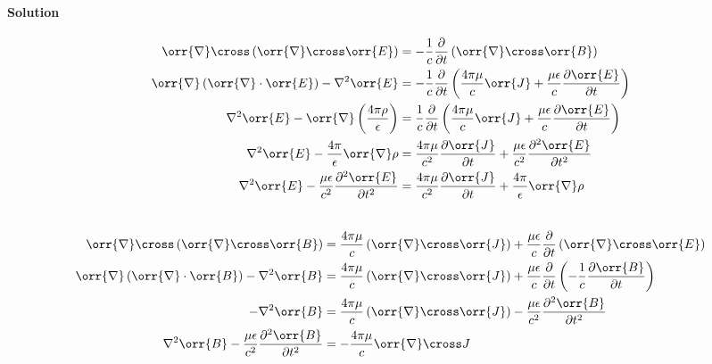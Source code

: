 \documentclass{article}
\begin{document}
{\begin{enumerate}
\begin{enumerate}
				\paragraph{Solution} \unboldmath  
				\begin{equation*}
					\begin{split}
						\orr{\nabla} \cross \left( \orr{\nabla} \cross \orr{E} \right) &= -\frac{1}{c} \frac{\partial}{\partial t} \left( \orr{\nabla} \cross \orr{B} \right) \\
						\orr{\nabla} \left( \orr{\nabla} \cdot \orr{E} \right) - \nabla^2 \orr{E} &= -\frac{1}{c} \frac{\partial}{\partial t} \left( \frac{4\pi \mu}{c} \orr{J} + \frac{\mu \epsilon}{c} \frac{\partial \orr{E}}{\partial t} \right) \\
						\nabla^2 \orr{E} - \orr{\nabla} \left( \frac{4\pi \rho}{\epsilon} \right) &= \frac{1}{c} \frac{\partial}{\partial t} \left( \frac{4\pi \mu}{c} \orr{J} + \frac{\mu \epsilon}{c} \frac{\partial \orr{E}}{\partial t} \right) \\
						\nabla^2 \orr{E} - \frac{4\pi}{\epsilon} \orr{\nabla} \rho  &= \frac{4\pi \mu}{c^2} \frac{\partial \orr{J}}{\partial t} + \frac{\mu \epsilon}{c^2} \frac{\partial^2 \orr{E}}{\partial t^2} \\
						\nabla^2 \orr{E} - \frac{\mu \epsilon}{c^2} \frac{\partial^2 \orr{E}}{\partial t^2} &= \frac{4\pi \mu}{c^2} \frac{\partial \orr{J}}{\partial t} + \frac{4\pi}{\epsilon} \orr{\nabla} \rho
					\end{split}
				\end{equation*} \\
				\begin{equation*}
					\begin{split}
						\orr{\nabla} \cross \left( \orr{\nabla} \cross \orr{B} \right) &= \frac{4\pi \mu}{c} \left( \orr{\nabla} \cross \orr{J} \right) + \frac{\mu \epsilon}{c} \frac{\partial}{\partial t} \left( \orr{\nabla} \cross \orr{E} \right) \\
						\orr{\nabla} \left( \orr{\nabla} \cdot \orr{B} \right) -\nabla^2 \orr{B} &= \frac{4\pi \mu}{c} \left( \orr{\nabla} \cross \orr{J} \right) + \frac{\mu \epsilon}{c} \frac{\partial}{\partial t} \left( -\frac{1}{c} \frac{\partial \orr{B}}{\partial t} \right) \\
						-\nabla^2 \orr{B} &= \frac{4\pi \mu}{c} \left( \orr{\nabla} \cross \orr{J} \right) - \frac{\mu \epsilon}{c^2} \frac{\partial^2 \orr{B}}{\partial t^2} \\
						\nabla^2 \orr{B} - \frac{\mu \epsilon}{c^2} \frac{\partial^2 \orr{B}}{\partial t^2} &= -\frac{4\pi \mu}{c} \orr{\nabla} \cross J

\end{split}
\end{equation*}
\end{enumerate}
\end{enumerate}}
\end{document}
